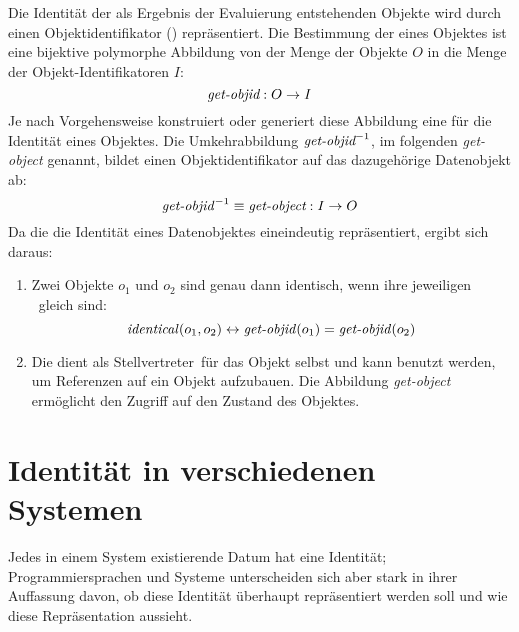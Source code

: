 %
Die Identit\"{a}t der als Ergebnis der Evaluierung entstehenden
Objekte wird durch einen Objektidentifikator (\objid\/)
repr\"{a}sentiert.
Die Bestimmung der \objid\/ eines Objektes ist eine bijektive
polymorphe Abbildung von der Menge der Objekte $O$ in die Menge
der Objekt-Identifikatoren $I$:
%
\begin{equation}
\mbox{\em get-objid} : O \rightarrow I
\end{equation}
%
Je nach Vorgehensweise konstruiert oder generiert diese Abbildung eine 
\representationform{} f\"{u}r die Identit\"{a}t eines Objektes.
Die Umkehrabbildung $\mbox{\em get-objid}^{-1}$, im folgenden
{\em get-object\/} genannt, bildet einen Objektidentifikator
auf das dazugeh\"{o}rige Datenobjekt ab:
%
\begin{equation}\label{equ:getobj}
\mbox{\em get-objid\/}^{-1} \equiv \mbox{\em get-object} :
I \rightarrow O
\end{equation}
%
Da die \objid\/ die Identit\"{a}t eines Datenobjektes eineindeutig
repr\"{a}sentiert, ergibt sich daraus:
%
\begin{enumerate}
%
\item Zwei Objekte $o_1$ und $o_2$ sind genau dann identisch, wenn
ihre jeweiligen \objid[s]\ gleich sind:
\begin{equation}
\mbox{\em identical\/}(o_1,o_2) \leftrightarrow
\mbox{\em get-objid\/}(o_1) = \mbox{\em get-objid\/}(o_2) 
\end{equation}
%
\item Die \objid\/ dient als \rglq{}Stellvertreter\rgrq\ f\"{u}r das Objekt
selbst und kann benutzt werden, um Referenzen auf ein Objekt
aufzubauen. Die Abbildung {\em get-object\/} erm\"{o}glicht den Zugriff
auf den Zustand des Objektes.
%
\end{enumerate}
%
\section{Identit\"{a}t in verschiedenen Systemen}%
\label{sec:idmsys}
%
Jedes in einem System existierende Datum hat eine Identit\"{a}t;
Programmiersprachen und Systeme unterscheiden sich aber stark
in ihrer Auffassung davon, ob diese Identit\"{a}t \"{u}berhaupt
repr\"{a}sentiert werden soll und wie diese Repr\"{a}sentation
aussieht.
%
